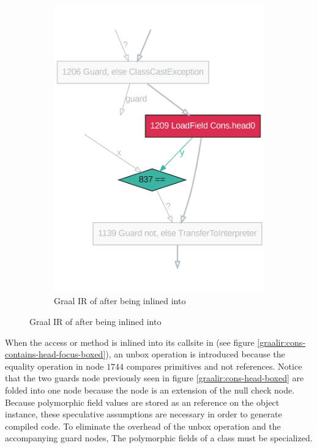 \begin{figure}[!htb]
\begin{subfigure}[b]{0.4\textwidth}
		\includegraphics[width=\textwidth]{figures/dot/List.contains.specialized.TruffleTier.png}
		\caption{Graal IR of  after being inlined into }
		\label{graalir:cons-contains-head-focus-specialized}
	\end{subfigure}
	\hfill
\end{figure}

When the access or method  is inlined into its callsite in  (see figure \ref{graalir:cons-contains-head-focus-boxed}), an unbox operation is introduced because the equality operation in node $1744$ compares primitives and not references.
Notice that the two guards node previously seen in figure \ref{graalir:cons-head-boxed} are folded into one node because the  node is an extension of the null check node.
Because polymorphic field values are stored as an reference on the object instance, these speculative assumptions are necessary in order to generate compiled code.
To eliminate the overhead of the unbox operation and the accompanying guard nodes, The polymorphic fields of a class must be specialized.

